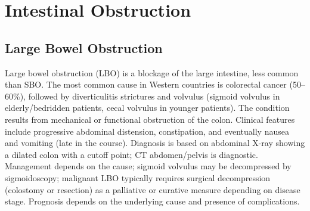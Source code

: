 \section{Intestinal Obstruction}








\label{sec:Intestinal Obstruction}

\subsection{Large Bowel Obstruction}
\label{sec:Large Bowel Obstruction}
Large bowel obstruction (LBO) is a blockage of the large intestine, less common than SBO. The most common cause in Western countries is colorectal cancer (50--60\%), followed by diverticulitis strictures and volvulus (sigmoid volvulus in elderly/bedridden patients, cecal volvulus in younger patients). The condition results from mechanical or functional obstruction of the colon. Clinical features include progressive abdominal distension, constipation, and eventually nausea and vomiting (late in the course). Diagnosis is based on abdominal X-ray showing a dilated colon with a cutoff point; CT abdomen/pelvis is diagnostic. Management depends on the cause; sigmoid volvulus may be decompressed by sigmoidoscopy; malignant LBO typically requires surgical decompression (colostomy or resection) as a palliative or curative measure depending on disease stage. Prognosis depends on the underlying cause and presence of complications.

